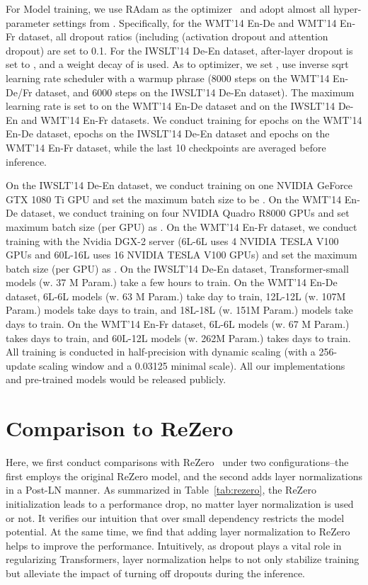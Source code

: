 \documentclass[11pt,a4paper]{article}
\begin{document}
For Model training, we use RAdam as the optimizer~\cite{Liu2019OnTV} and adopt almost all hyper-parameter settings from \citet{lu2020understanding}.
Specifically, for the WMT'14 En-De and WMT'14 En-Fr dataset, all dropout ratios (including (activation dropout and attention dropout) are set to 0.1. 
For the IWSLT'14 De-En dataset, after-layer dropout is set to , and a weight decay of  is used. 
As to optimizer, we set ,  use inverse sqrt learning rate scheduler with a warmup phrase (8000 steps on the WMT'14 En-De/Fr dataset, and 6000 steps on the IWSLT'14 De-En dataset). 
The maximum learning rate is set to  on the WMT'14 En-De dataset and  on the IWSLT'14 De-En and WMT'14 En-Fr datasets. 
We conduct training for  epochs on the WMT'14 En-De dataset,  epochs on the IWSLT'14 De-En dataset and  epochs on the WMT'14 En-Fr dataset, while the last 10 checkpoints are averaged before inference. 

On the IWSLT'14 De-En dataset, we conduct training on one NVIDIA GeForce GTX 1080 Ti GPU and set the maximum batch size to be . 
On the WMT'14 En-De dataset, we conduct training on four NVIDIA Quadro R8000 GPUs and set maximum batch size (per GPU) as . 
On the WMT'14 En-Fr dataset, we conduct training with the Nvidia DGX-2 server (6L-6L uses 4 NVIDIA TESLA V100 GPUs and 60L-16L uses 16 NVIDIA TESLA V100 GPUs) and set the maximum batch size (per GPU) as . 
On the IWSLT'14 De-En dataset, Transformer-small models (w. 37 M Param.) take a few hours to train.
On the WMT'14 En-De dataset, 6L-6L models (w. 63 M Param.) take  day to train, 
12L-12L (w. 107M Param.) models take  days to train, 
and 18L-18L (w. 151M Param.) models take  days to train. 
On the WMT'14 En-Fr dataset, 6L-6L models (w. 67 M Param.) takes  days to train, and 60L-12L models (w. 262M Param.) takes  days to train. 
All training is conducted in half-precision with dynamic scaling (with a 256-update scaling window and a 0.03125 minimal scale).
All our implementations and pre-trained models would be released publicly. 

\section{Comparison to ReZero}
\label{appendix:rezero}

Here, we first conduct comparisons with ReZero~\cite{Bachlechner2020ReZeroIA} under two configurations--the first employs the original ReZero model, and the second adds layer normalizations in a Post-LN manner. 
As summarized in Table~\ref{tab:rezero}, the ReZero initialization leads to a performance drop, no matter layer normalization is used or not. 
It verifies our intuition that over small dependency restricts the model potential. 
At the same time, we find that adding layer normalization to ReZero helps to improve the performance. 
Intuitively, as dropout plays a vital role in regularizing Transformers, layer normalization helps to not only stabilize training but alleviate the impact of turning off dropouts during the inference. 
\end{document}

